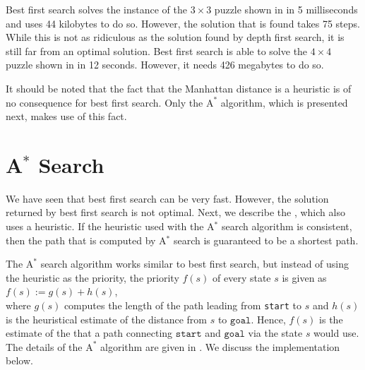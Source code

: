 Best first search solves the instance of the $3 \times 3$ puzzle shown in  in 
5 milliseconds and uses 44 kilobytes to do so.  However, the solution that is found takes 75 steps.  While
this is not as ridiculous as the solution found by depth first search, it is still far from an optimal
solution.  Best first search is able to solve the $4 \times 4$ puzzle shown in
 in 12 seconds.  However, it needs 426 megabytes to do so.

It should be noted that the fact that the Manhattan distance is a  heuristic is of
no consequence for best first search.  Only the $\mathrm{A}^*$ algorithm, which is presented next, makes use of
this fact.

\section{A$^*$ Search \label{sec:a-star-search}}
We have seen that best first search can be very fast.  However, the solution returned by best first search is
not optimal.  Next, we describe the , which also uses a heuristic.  
If the heuristic used with the A$^*$ search algorithm is consistent, then the path that is computed by A$^*$
search is guaranteed to be a shortest path.

The $\mathrm{A}^*$ search algorithm works similar to best first search,
but instead of using the heuristic as the priority, the priority $f(s)$ of every state $s$ is given as
\\[0.2cm]
\hspace*{1.3cm}
$f(s) := g(s) + h(s)$,
\\[0.2cm]
where $g(s)$ computes the length of the path leading from \texttt{start} to $s$ and $h(s)$ is the heuristical
estimate of the distance from $s$ to $\texttt{goal}$.  Hence, $f(s)$ is the estimate of the  that
a path connecting $\texttt{start}$ and $\texttt{goal}$ via the state $s$ would use.
The details of the $\mathrm{A}^*$ algorithm are given in .  We discuss the implementation below. 


